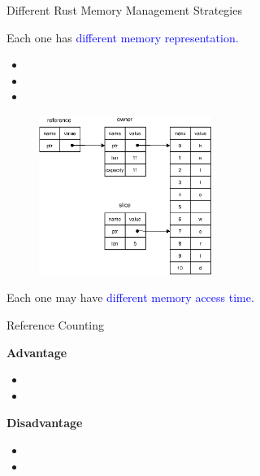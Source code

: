 \documentclass[9pt]{beamer}
\begin{document}

\begin{frame}[fragile]{Different Rust Memory Management Strategies}

    Each one has \textcolor{blue}{different memory representation.}
    \begin{itemize}
        \item {} 
        \item {}
        \item {}
    \end{itemize}

    \pause

    \begin{figure}[hp]
        \centering
        \begin{center}
                \includegraphics[width=0.5\textwidth]{images/own_ref_slice.eps}
                \captionsetup{labelformat=empty}
        \end{center}
    \end{figure}

    Each one may have \textcolor{blue}{different memory access time.}
\end{frame}


\begin{frame}[fragile]{Reference Counting}

    \textbf{Advantage}
    \begin{itemize}
        \item {} 
        \item {}
    \end{itemize}

    \vspace{0.5cm}

    \textbf{Disadvantage}
    \begin{itemize}
        \item {} 
        \item {}
    \end{itemize}


\end{frame}
\end{document}
